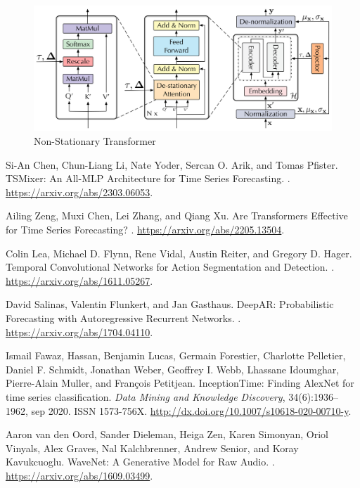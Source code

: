 \documentclass[12pt,fleqn]{article}
\begin{document}
\begin{figure}[!htb]
    \centering
    \includegraphics[width=0.5\linewidth]{notes.assets/image-20241018002155665.png}
    \caption{Non-Stationary Transformer}
    \label{fig:enter-label}
\end{figure}

\begin{thebibliography}{9}

Si-An Chen, Chun-Liang Li, Nate Yoder, Sercan O. Arik, and Tomas Pfister.
\newblock TSMixer: An All-MLP Architecture for Time Series Forecasting.
.
\newblock \url{https://arxiv.org/abs/2303.06053}.

Ailing Zeng, Muxi Chen, Lei Zhang, and Qiang Xu.
\newblock Are Transformers Effective for Time Series Forecasting?
.
\newblock \url{https://arxiv.org/abs/2205.13504}.

Colin Lea, Michael D. Flynn, Rene Vidal, Austin Reiter, and Gregory D. Hager.
\newblock Temporal Convolutional Networks for Action Segmentation and Detection.
.
\newblock \url{https://arxiv.org/abs/1611.05267}.

David Salinas, Valentin Flunkert, and Jan Gasthaus.
\newblock DeepAR: Probabilistic Forecasting with Autoregressive Recurrent Networks.
.
\newblock \url{https://arxiv.org/abs/1704.04110}.

Ismail Fawaz, Hassan, Benjamin Lucas, Germain Forestier, Charlotte Pelletier, Daniel F. Schmidt, Jonathan Weber, Geoffrey I. Webb, Lhassane Idoumghar, Pierre-Alain Muller, and François Petitjean.
\newblock InceptionTime: Finding AlexNet for time series classification.
\newblock \emph{Data Mining and Knowledge Discovery}, 34(6):1936–1962, sep 2020.
\newblock ISSN 1573-756X.
\newblock \url{http://dx.doi.org/10.1007/s10618-020-00710-y}.

Aaron van den Oord, Sander Dieleman, Heiga Zen, Karen Simonyan, Oriol Vinyals, Alex Graves, Nal Kalchbrenner, Andrew Senior, and Koray Kavukcuoglu.
\newblock WaveNet: A Generative Model for Raw Audio.
.
\newblock \url{https://arxiv.org/abs/1609.03499}.


\end{thebibliography}
\end{document}
